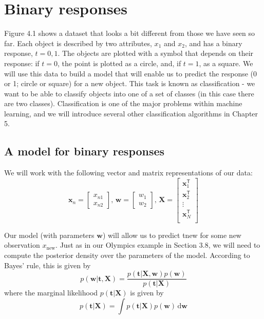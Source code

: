 \section{Binary responses}

Figure 4.1 shows a dataset that looks a bit different from those we have seen so far.
Each object is described by two attributes, $x_1$ and $x_2$,
and has a binary response,
$t = {0, 1}$. The objects are plotted with a symbol that depends on their response: if
$t = 0$, the point is plotted as a circle, and, if $t = 1$, as a square. We will use this data
to build a model that will enable us to predict the response (0 or 1; circle or square)
for a new object. This task is known as classification - we want to be able to classify
objects into one of a set of classes (in this case there are two classes). Classification
is one of the major problems within machine learning, and we will introduce several
other classification algorithms in Chapter 5.

\subsection{A model for binary responses}

We will work with the following vector and matrix representations of our data:
\begin{equation*}
\mathbf{x}_{n} = \begin{bmatrix}
x_{n1} \\ x_{n2}
\end{bmatrix}, \,
\mathbf{w} = \begin{bmatrix}
w_{1} \\ w_{2}
\end{bmatrix}, \,
\mathbf{X} = \begin{bmatrix}
\mathbf{x}_{1}^{\mathsf{T}} \\
\mathbf{x}_{2}^{\mathsf{T}} \\
\vdots \\
\mathbf{x}_{N}^{\mathsf{T}} \\
\end{bmatrix}
\end{equation*}

Our model (with parameters $\mathbf{w}$) will allow us to predict
tnew for some new observation
$x_{\mathrm{new}}$.
Just as in our Olympics example in Section 3.8, we will need to compute the
posterior density over the parameters of the model. According to Bayes' rule, this
is given by
\begin{equation}
p(\mathbf{w}|\mathbf{t},\mathbf{X}) =
\frac{p(\mathbf{t}|\mathbf{X},\mathbf{w})p(\mathbf{w})}{p(\mathbf{t}|\mathbf{X})}
\end{equation}
where the marginal likelihood $p(\mathbf{t}|\mathbf{X})$ is given by
\begin{equation}
p(\mathbf{t}|\mathbf{X}) = \int p(\mathbf{t}|\mathbf{X}) p(\mathbf{w})\, \mathrm{d}\mathbf{w}
\end{equation}

